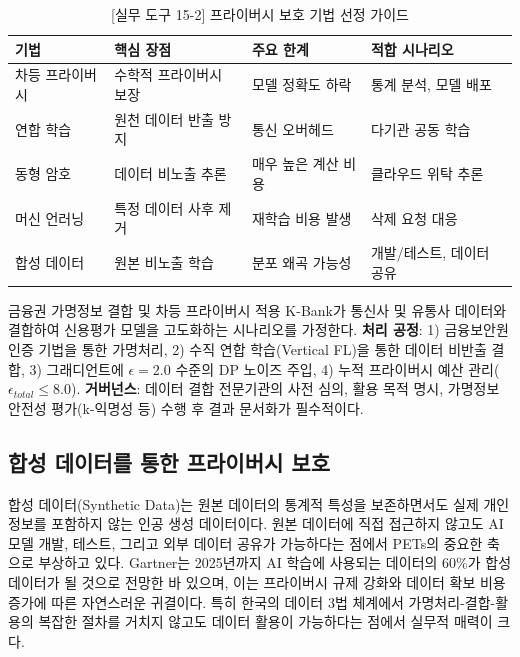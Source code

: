 \begin{table}[htbp]
\centering
\caption{[실무 도구 15-2] 프라이버시 보호 기법 선정 가이드}
\label{tab:pet_guide}
\begin{tabularx}{\textwidth}{p{2.5cm}Xp{2.5cm}X}
\toprule
\textbf{기법} & \textbf{핵심 장점} & \textbf{주요 한계} & \textbf{적합 시나리오} \\
\midrule
차등 프라이버시 & 수학적 프라이버시 보장 & 모델 정확도 하락 & 통계 분석, 모델 배포 \\
연합 학습 & 원천 데이터 반출 방지 & 통신 오버헤드 & 다기관 공동 학습 \\
동형 암호 & 데이터 비노출 추론 & 매우 높은 계산 비용 & 클라우드 위탁 추론 \\
머신 언러닝 & 특정 데이터 사후 제거 & 재학습 비용 발생 & 삭제 요청 대응 \\
합성 데이터 & 원본 비노출 학습 & 분포 왜곡 가능성 & 개발/테스트, 데이터 공유 \\
\bottomrule
\end{tabularx}
\end{table}

\begin{practicaltool}{금융권 가명정보 결합 및 차등 프라이버시 적용}
K-Bank가 통신사 및 유통사 데이터와 결합하여 신용평가 모델을 고도화하는 시나리오를 가정한다.
\textbf{처리 공정}: 1) 금융보안원 인증 기법을 통한 가명처리, 2) 수직 연합 학습(Vertical FL)을 통한 데이터 비반출 결합, 3) 그래디언트에 $\epsilon=2.0$ 수준의 DP 노이즈 주입, 4) 누적 프라이버시 예산 관리($\epsilon_{total} \leq 8.0$).
\textbf{거버넌스}: 데이터 결합 전문기관의 사전 심의, 활용 목적 명시, 가명정보 안전성 평가(k-익명성 등) 수행 후 결과 문서화가 필수적이다.
\end{practicaltool}

\subsection{합성 데이터를 통한 프라이버시 보호}
\label{sec:15.2.4}

합성 데이터(Synthetic Data)는 원본 데이터의 통계적 특성을 보존하면서도 실제 개인정보를 포함하지 않는 인공 생성 데이터이다. 원본 데이터에 직접 접근하지 않고도 AI 모델 개발, 테스트, 그리고 외부 데이터 공유가 가능하다는 점에서 PETs의 중요한 축으로 부상하고 있다. Gartner는 2025년까지 AI 학습에 사용되는 데이터의 60\%가 합성 데이터가 될 것으로 전망한 바 있으며, 이는 프라이버시 규제 강화와 데이터 확보 비용 증가에 따른 자연스러운 귀결이다. 특히 한국의 데이터 3법 체계에서 가명처리-결합-활용의 복잡한 절차를 거치지 않고도 데이터 활용이 가능하다는 점에서 실무적 매력이 크다.

